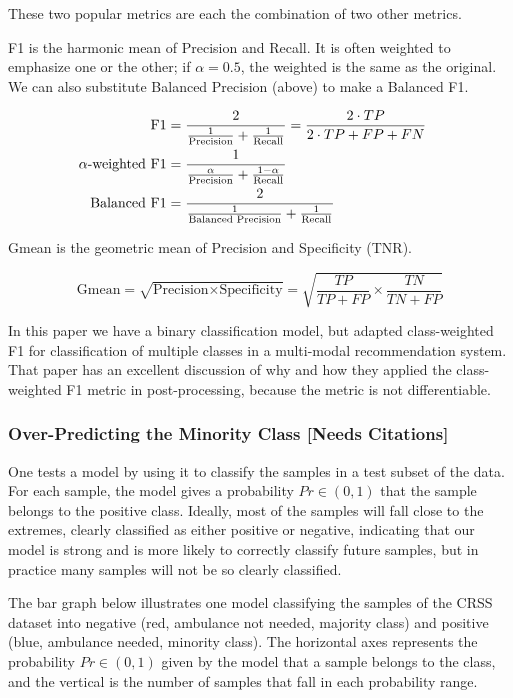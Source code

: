 These two popular metrics are each the combination of two other metrics.  

F1 is the harmonic mean of Precision and Recall.  It is often weighted to emphasize one or the other; if $\alpha = 0.5$, the weighted is the same as the original.  We can also substitute Balanced Precision (above) to make a Balanced F1. 

\begin{align*}
	\text{F1} &= \frac{2}{\frac{1}{\text{Precision}} + \frac{1}{\text{Recall}}} 
	= \frac{2 \cdot TP}{2\cdot TP + FP + FN}\cr
	\text{$\alpha$-weighted F1} &= \frac{1}{\frac{\alpha}{\text{Precision}} + \frac{1 - \alpha}{\text{Recall}}} \cr
	\text{Balanced F1} &= \frac{2}{\frac{1}{\text{Balanced Precision}} + \frac{1}{\text{Recall}}} 
\end{align*}


Gmean is the geometric mean of Precision and Specificity (TNR).

$$
	\text{Gmean} = \sqrt{ \text{Precision} \times \text{Specificity}} 
	= \sqrt{
		\frac{TP}{TP+FP} \times \frac{TN}{TN+FP}
		}
$$

In this paper we have a binary classification model, but
\cite{LIU2021103070} adapted class-weighted F1 for classification of multiple classes in a multi-modal recommendation system.  That paper has an excellent discussion of why and how they applied the class-weighted F1 metric in post-processing, because the metric is not differentiable.  

\subsubsection{Over-Predicting the Minority Class [Needs Citations]}

One tests a model by using it to classify the samples in a test subset of the data.  For each sample, the model gives a probability $Pr \in (0,1)$ that the sample belongs to the positive class.    Ideally, most of the samples will fall close to the extremes, clearly classified as either positive or negative, indicating that our model is strong and is more likely to correctly classify future samples, but in practice many samples will not be so clearly classified.  

The bar graph below illustrates one model classifying the samples of the CRSS dataset into negative (red, ambulance not needed, majority class) and positive (blue, ambulance needed, minority class).  The horizontal axes represents the probability $Pr \in (0,1)$ given by the model that a sample belongs to the class, and the vertical is the number of samples that fall in each probability range.  

